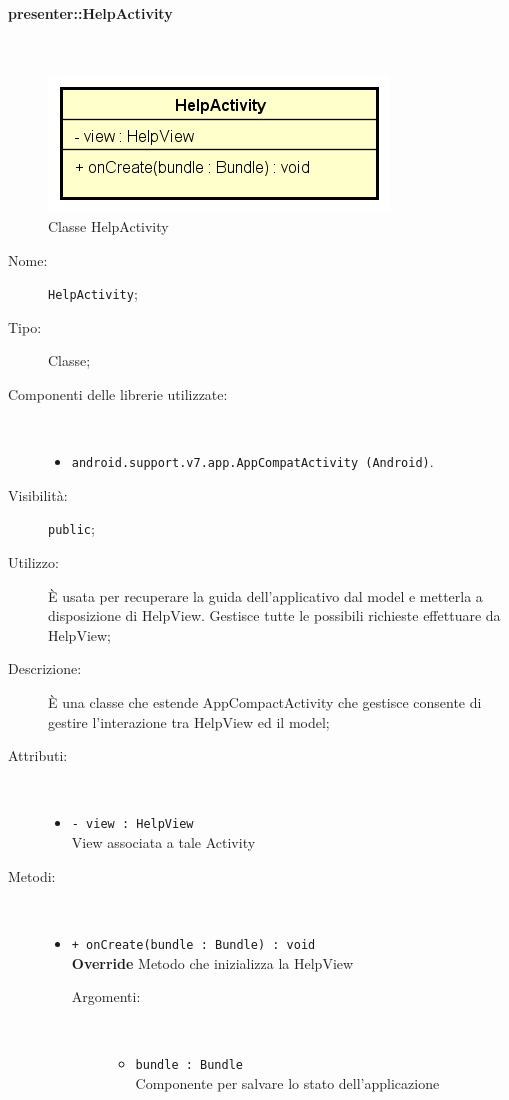 \documentclass[../DefinizioneDiProdotto.tex]{subfiles}
\begin{document}
\paragraph{presenter::HelpActivity}
\
\begin{figure}[H]
	\centering
	\includegraphics[width=\maxwidth]{img/HelpActivity.png}
	\caption{Classe HelpActivity}\label{fig:presenter::HelpActivity} 
\end{figure}
\begin{description}
	\item[Nome:] \texttt{HelpActivity};
	\item[Tipo:] Classe;
	\item[Componenti delle librerie utilizzate:] \
	\begin{itemize}
		\item \texttt{android.support.v7.app.AppCompatActivity (Android)}.
		
	\end{itemize}
	\item[Visibilità:] \texttt{public};
	\item[Utilizzo:] È usata per recuperare la guida dell'applicativo dal model e metterla a disposizione di HelpView. Gestisce tutte le possibili richieste effettuare da HelpView;
	\item[Descrizione:] È una classe che estende AppCompactActivity che gestisce consente di gestire l'interazione tra HelpView ed il model;
	\item[Attributi:] \
	\begin{itemize}
		\item \texttt{- view : HelpView}\\
		View associata a tale Activity
		
	\end{itemize}
	\item[Metodi:] \
	\begin{itemize}
		\item \texttt{+ onCreate(bundle : Bundle) : void}\\
		\textbf{Override} Metodo che inizializza la HelpView
		\begin{description}
			\item[Argomenti:] \
			\begin{itemize}
				\item \texttt{bundle : Bundle}\\
				Componente per salvare lo stato dell'applicazione\end{itemize}
		\end{description}
	\end{itemize}
\end{description}
\end{document}

